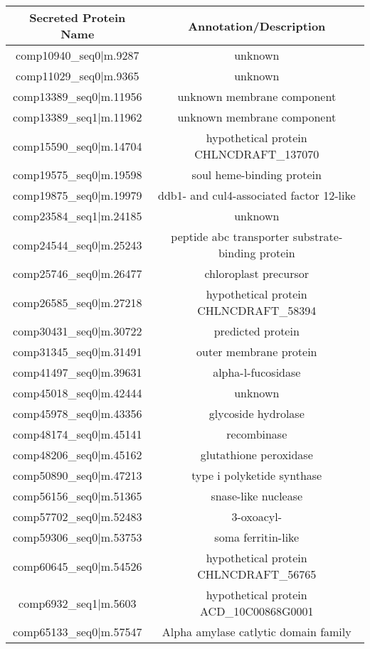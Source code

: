 \begin{table}
    \centering
    \begin{tabular}{|c|c|}
        \hline
        \textbf{Secreted Protein Name} & \textbf{Annotation/Description} \\
        \hline
        comp10940\_seq0|m.9287  &  unknown \\
        comp11029\_seq0|m.9365  &  unknown\\
        comp13389\_seq0|m.11956 &  unknown membrane component \\
        comp13389\_seq1|m.11962 &  unknown membrane component \\
        comp15590\_seq0|m.14704 &  hypothetical protein CHLNCDRAFT\_137070\\
        comp19575\_seq0|m.19598 &  soul heme-binding protein\\
        comp19875\_seq0|m.19979 &  ddb1- and cul4-associated factor 12-like\\
        comp23584\_seq1|m.24185 &  unknown\\
        comp24544\_seq0|m.25243 &  peptide abc transporter substrate-binding protein\\
        comp25746\_seq0|m.26477 &  chloroplast precursor\\
        comp26585\_seq0|m.27218 &  hypothetical protein CHLNCDRAFT\_58394\\
        comp30431\_seq0|m.30722 &  predicted protein\\
        comp31345\_seq0|m.31491 &  outer membrane protein\\
        comp41497\_seq0|m.39631 &  alpha-l-fucosidase\\
        comp45018\_seq0|m.42444 &  unknown \\ 
        comp45978\_seq0|m.43356 &  glycoside hydrolase\\
        comp48174\_seq0|m.45141 &  recombinase\\
        comp48206\_seq0|m.45162 &  glutathione peroxidase\\
        comp50890\_seq0|m.47213 &  type i polyketide synthase\\
        comp56156\_seq0|m.51365 &  snase-like nuclease\\
        comp57702\_seq0|m.52483 &  3-oxoacyl-\\
        comp59306\_seq0|m.53753 &  soma ferritin-like\\
        comp60645\_seq0|m.54526 &  hypothetical protein CHLNCDRAFT\_56765\\
        comp6932_seq1|m.5603    & hypothetical protein ACD\_10C00868G0001\\
        comp65133\_seq0|m.57547    & Alpha amylase catlytic domain family \\
        \hline
    \end{tabular}
\end{table}


